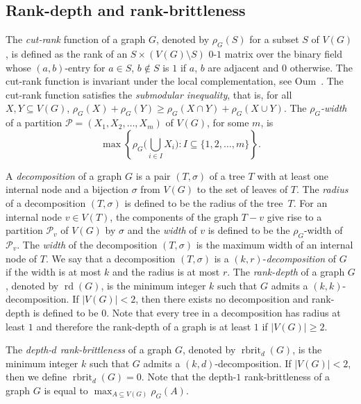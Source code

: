 \documentclass[11pt]{article}
\newcommand\abs[1]{\lvert #1\rvert}
\newcommand\cutrk{\rho}
\newcommand\rd{\operatorname{rd}}
\newcommand\rbrit{\operatorname{rbrit}}
\begin{document}
        \subsection{Rank-depth and rank-brittleness}
The \emph{cut-rank} function of a graph $G$, denoted by $\cutrk_G(S)$ for a subset $S$ of $V(G)$,
is defined as the rank of an $S\times (V(G)\setminus S)$ $0$-$1$ matrix over the binary field whose $(a,b)$-entry for $a\in S$, $b\notin S$ is $1$ if $a$, $b$ are adjacent and $0$ otherwise.
The cut-rank function is invariant under the local complementation, see Oum~\cite{Oum2004}.
The cut-rank function satisfies the \emph{submodular inequality}, that is, for all $X,Y\subseteq V(G)$, 
$\rho_G(X)+\rho_G(Y)\ge \rho_G(X\cap Y)+\rho_G(X\cup Y)$. 
The \emph{$\rho_G$-width} of a partition $\mathcal P=(X_1,X_2,\ldots,X_m)$ of $V(G)$, for some $m$,
        is \[
          \max\left\{ \rho_G\bigl(\bigcup_{i\in I} X_i\bigr): I\subseteq \{1,2,\ldots,m\}\right\}.
        \]

A \emph{decomposition} of a  graph $G$  is 
a pair $(T,\sigma)$ of a tree $T$ with at least one internal node and a bijection $\sigma$ from $V(G)$ to the set of leaves of $T$.
The \emph{radius} of a decomposition $(T,\sigma)$ 
is defined to be the radius of the tree~$T$. 
For an internal node $v \in V(T)$, the components of the graph $T - v$ give rise to a partition $\mathcal P_v$ of $V(G)$ by $\sigma$
and the \emph{width} of $v$ is defined to be 
the $\rho_G$-width of $\mathcal P_v$. 
%
The \emph{width} of the decomposition $(T,\sigma)$ is the maximum width of an internal node of $T$.
We say that a decomposition $(T, \sigma)$ is a $(k,r)$-\emph{decomposition} of $G$
if the width is at most $k$ and the radius is at most $r$. 
The \emph{rank-depth} of a graph $G$, denoted by $\rd(G)$, is the minimum integer $k$ such that 
$G$ admits a $(k, k)$-decomposition.
If $\abs{V(G)}<2$, then there exists no decomposition and rank-depth is defined to be $0$.
Note that every tree in a decomposition has radius at least $1$ and therefore
the rank-depth of a graph is at least $1$ if $\abs{V(G)}\ge 2$.


The \emph{depth-$d$ rank-brittleness} of a graph $G$,
denoted by $\rbrit_d(G)$, is the minimum integer $k$
such that $G$ admits a $(k,d)$-decomposition.
If $\abs{V(G)}<2$, then we define $\rbrit_d(G)=0$.
Note that the depth-$1$ rank-brittleness of a graph $G$
is equal to $\max_{A\subseteq V(G)} \rho_G(A)$.	
\end{document}
